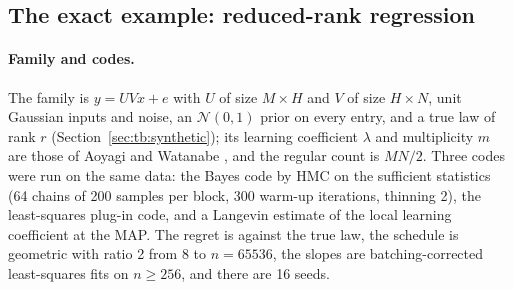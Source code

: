 \documentclass[11pt,a4paper]{article}
\begin{document}
\subsection{The exact example: reduced-rank regression}
\label{sec:coef:rrr}

\paragraph{Family and codes.} The family is $y=UVx+e$ with $U$ of size $M\times H$ and $V$ of size $H\times N$, unit Gaussian inputs and noise, an $\mathcal N(0,1)$ prior on every entry, and a true law of rank $r$ (Section~\ref{sec:tb:synthetic}); its learning coefficient $\lambda$ and multiplicity $m$ are those of Aoyagi and Watanabe \cite{aoyagiwatanabe2005}, and the regular count is $MN/2$. Three codes were run on the same data: the Bayes code by HMC on the sufficient statistics (64 chains of 200 samples per block, 300 warm-up iterations, thinning 2), the least-squares plug-in code, and a Langevin estimate of the local learning coefficient at the MAP. The regret is against the true law, the schedule is geometric with ratio 2 from 8 to $n=65536$, the slopes are batching-corrected least-squares fits on $n\ge256$, and there are 16 seeds.
\end{document}
